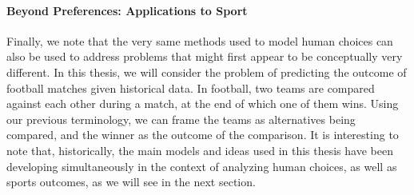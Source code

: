 \paragraph{Beyond Preferences: Applications to Sport}
Finally, we note that the very same methods used to model human choices can also be used to address problems that might first appear to be conceptually very different.
In this thesis, we will consider the problem of predicting the outcome of football matches given historical data.
In football, two teams are compared against each other during a match, at the end of which one of them wins.
Using our previous terminology, we can frame the teams as alternatives being compared, and the winner as the outcome of the comparison.
It is interesting to note that, historically, the main models and ideas used in this thesis have been developing simultaneously in the context of analyzing human choices, as well as sports outcomes, as we will see in the next section.
